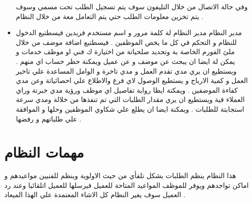 \documentclass[25pt]{article}
\begin{document}
\begin{itemize}
		 وفي حالة الاتصال من خلال التليفون سوف يتم تسجيل الطلب تحت مسمي  وسوف يتم تخزين معلومات الطلب حتي يتم التعامل معة من خلال النظام .
	\newline
	\newline
	\item مدير النظام
	\newline
	مدير النظام لة كلمة مرور و اسم مستخدم فريدين فيسطتيع الدخول للنظام و التحكم في كل ما يخص الموظفين .
	\newline
	فيسطتيع اضافة موضف من خلال ملئ الفورم الخاصة بة وتحديد صلحياتة من اختيارة ك فني او موظف خدمات و يمكن لة ايضا ان يبحث عن موضف و عن عميل  ويمكنة حظر حساب اي منهم .
	\newline
	ويستطيع ان يري مدي تقدم العمل و مدي تاخرة و الوامل المساعدة علي تاخير العمل و كمية الارباح و يستطيع الوصول لاي فرع والاطلاع علي احصائياتة وعن مدي كفاءة الموضفين .
	\newline 
	ويمكنة ايظا رواية تفاصيل اي موظف ورؤية مدي خبرتة وراي العملاء فية ويستطيع ان يري مقدار الطلبات التي تم تنفذها من خلالة ومدي سرعة استجابتة للطلبات .
	 \newline
	 ويمكنة ايضا ان يطلع علي شكاوي الموظفين وحلها و الموافقة علي طلباتهم و رفضها .
	 \newline
	 \newline
	\end{itemize}
	\section*{مهمات النظام}
	هذا النظام ينظم الطلبات بشكل تلقأي من حيث الاولوية وينظم للفنيين مواعيدهم و اماكن تواجدهم ويوفر للموظف المواعيد المتاحة للعميل فيرسلها للعميل اتلقائيا وعند رد العميل سوف يغير النظام كل الاشاء المعتمدة علي الهذا الميعاد  . 
	
\end{document}

